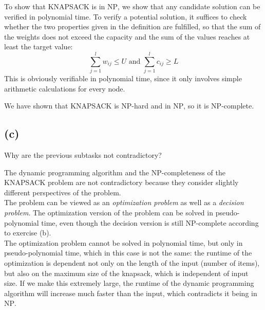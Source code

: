To show that \textsc{KNAPSACK} is in \textsc{NP}, we show that any candidate solution can be verified in polynomial time. To verify a potential solution, it suffices to check whether the two properties given in the definition are fulfilled, so that the sum of the weights does not exceed the capacity and the sum of the values reaches at least the target value:
$$\sum_{j=1}^{l}w_{ij}\leq U\text{ and }\sum_{j=1}^{l}c_{ij}\geq L$$
This is obviously verifiable in polynomial time, since it only involves simple arithmetic calculations for every node.

We have shown that \textsc{KNAPSACK} is \textsc{NP}-hard and in \textsc{NP}, so it is \textsc{NP}-complete.

\subsection{(c)}

Why are the previous subtasks not contradictory?

The dynamic programming algorithm and the \textsc{NP}-completeness of the \textsc{KNAPSACK} problem are not contradictory because they consider slightly different perspectives of the problem.\\
The problem can be viewed as an \textit{optimization problem} as well as a \textit{decision problem}. The optimization version of the problem can be solved in pseudo-polynomial time, even though the decision version is still \textsc{NP}-complete according to exercise (b).\\
The optimization problem cannot be solved in polynomial time, but only in pseudo-polynomial time, which in this case is not the same: the runtime of the optimization is dependent not only on the length of the input (number of items), but also on the maximum size of the knapsack, which is independent of input size. If we make this extremely large, the runtime of the dynamic programming algorithm will increase much faster than the input, which contradicts it being in \textsc{NP}.


